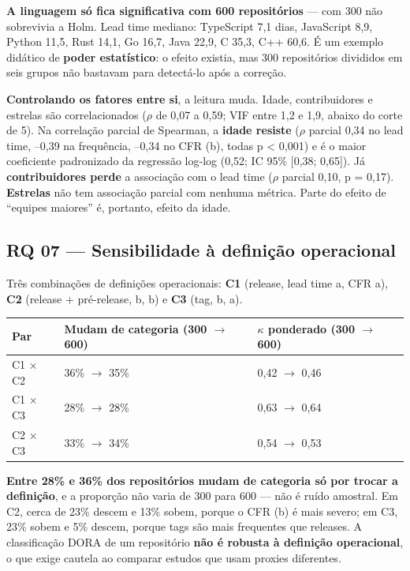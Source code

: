 \documentclass[12pt]{article}
\begin{document}
\textbf{A linguagem só fica significativa com 600 repositórios} — com 300 não sobrevivia a Holm. Lead time mediano: TypeScript 7,1 dias, JavaScript 8,9, Python 11,5, Rust 14,1, Go 16,7, Java 22,9, C 35,3, C++ 60,6. É um exemplo didático de \textbf{poder estatístico}: o efeito existia, mas 300 repositórios divididos em seis grupos não bastavam para detectá-lo após a correção.

\textbf{Controlando os fatores entre si}, a leitura muda. Idade, contribuidores e estrelas são correlacionados ($\rho$ de 0,07 a 0,59; VIF entre 1,2 e 1,9, abaixo do corte de 5). Na correlação parcial de Spearman, a \textbf{idade resiste} ($\rho$ parcial 0,34 no lead time, --0,39 na frequência, --0,34 no CFR (b), todas p < 0,001) e é o maior coeficiente padronizado da regressão log-log (0,52; IC 95\% [0,38; 0,65]). Já \textbf{contribuidores perde} a associação com o lead time ($\rho$ parcial 0,10, p = 0,17). \textbf{Estrelas} não tem associação parcial com nenhuma métrica. Parte do efeito de ``equipes maiores'' é, portanto, efeito da idade.

\subsection{RQ 07 — Sensibilidade à definição operacional}

Três combinações de definições operacionais: \textbf{C1} (release, lead time a, CFR a), \textbf{C2} (release + pré-release, b, b) e \textbf{C3} (tag, b, a).

\begin{table}[!htbp]
\centering
\scriptsize
\begin{tabular}{lll}
\toprule
\textbf{Par} & \textbf{Mudam de categoria (300 $\rightarrow$ 600)} & \textbf{$\kappa$ ponderado (300 $\rightarrow$ 600)} \\
\midrule
C1 $\times$ C2 & 36\% $\rightarrow$ 35\% & 0,42 $\rightarrow$ 0,46 \\
C1 $\times$ C3 & 28\% $\rightarrow$ 28\% & 0,63 $\rightarrow$ 0,64 \\
C2 $\times$ C3 & 33\% $\rightarrow$ 34\% & 0,54 $\rightarrow$ 0,53 \\
\bottomrule
\end{tabular}
\end{table}

\textbf{Entre 28\% e 36\% dos repositórios mudam de categoria só por trocar a definição}, e a proporção não varia de 300 para 600 — não é ruído amostral. Em C2, cerca de 23\% descem e 13\% sobem, porque o CFR (b) é mais severo; em C3, 23\% sobem e 5\% descem, porque tags são mais frequentes que releases. A classificação DORA de um repositório \textbf{não é robusta à definição operacional}, o que exige cautela ao comparar estudos que usam proxies diferentes.
\end{document}
